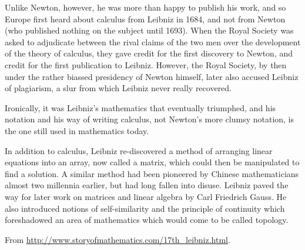 Unlike Newton, however, he was more than happy to publish his work, and so Europe first heard about calculus from Leibniz in 1684, and not from Newton (who published nothing on the subject until 1693). When the Royal Society was asked to adjudicate between the rival claims of the two men over the development of the theory of calculus, they gave credit for the first discovery to Newton, and credit for the first publication to Leibniz. However, the Royal Society, by then under the rather biassed presidency of Newton himself, later also accused Leibniz of plagiarism, a slur from which Leibniz never really recovered.

Ironically, it was Leibniz’s mathematics that eventually triumphed, and his notation and his way of writing calculus, not Newton’s more clumsy notation, is the one still used in mathematics today.

In addition to calculus, Leibniz re-discovered a method of arranging linear equations into an array, now called a matrix, which could then be manipulated to find a solution. A similar method had been pioneered by Chinese mathematicians almost two millennia earlier, but had long fallen into disuse. Leibniz paved the way for later work on matrices and linear algebra by Carl Friedrich Gauss. He also introduced notions of self-similarity and the principle of continuity which foreshadowed an area of mathematics which would come to be called topology.

\begin{flushright}
  From \url{http://www.storyofmathematics.com/17th_leibniz.html}.
\end{flushright}

